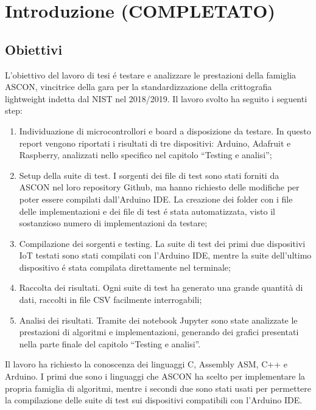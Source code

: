 \chapter{Introduzione (COMPLETATO)}

\section{Obiettivi}

L'obiettivo del lavoro di tesi é testare e analizzare le prestazioni della famiglia ASCON, vincitrice della gara per la standardizzazione della crittografia lightweight indetta dal NIST nel 2018/2019\cite{nist-competition}. Il lavoro svolto ha seguito i seguenti step: \begin{enumerate}
    \item Individuazione di microcontrollori e board a disposizione da testare. In questo report vengono riportati i risultati di tre dispositivi: Arduino, Adafruit e Raspberry, analizzati nello specifico nel capitolo ``Testing e analisi'';
    \item Setup della suite di test. I sorgenti dei file di test sono stati forniti da ASCON nel loro repository Github\cite{github}, ma hanno richiesto delle modifiche per poter essere compilati dall'Arduino IDE. La creazione dei folder con i file delle implementazioni e dei file di test é stata automatizzata, visto il sostanzioso numero di implementazioni da testare;
    \item Compilazione dei sorgenti e testing. La suite di test dei primi due dispositivi IoT testati sono stati compilati con l'Arduino IDE, mentre la suite dell'ultimo dispositivo é stata compilata direttamente nel terminale;
    \item Raccolta dei risultati. Ogni suite di test ha generato una grande quantità di dati, raccolti in file CSV facilmente interrogabili;
    \item Analisi dei risultati. Tramite dei notebook Jupyter sono state analizzate le prestazioni di algoritmi e implementazioni, generando dei grafici presentati nella parte finale del capitolo ``Testing e analisi''.
\end{enumerate}
Il lavoro ha richiesto la conoscenza dei linguaggi C, Assembly ASM, C++ e Arduino. I primi due sono i linguaggi che ASCON ha scelto per implementare la propria famiglia di algoritmi, mentre i secondi due sono stati usati per permettere la compilazione delle suite di test sui dispositivi compatibili con l'Arduino IDE. \\

